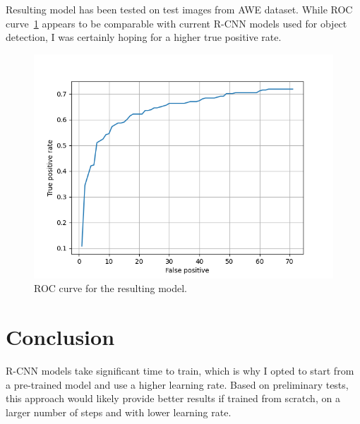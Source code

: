 \documentclass[9pt]{IEEEtran}
\begin{document}
Resulting model has been tested on test images from AWE dataset. While ROC curve~\ref{fig:plot1} appears to be comparable with current R-CNN models used for object detection, I was certainly hoping for a higher true positive rate.

\begin{figure}[h]
    \centering
    \includegraphics[width=1\columnwidth]{plot.png}
    \caption{ROC curve for the resulting model.}
    \label{fig:plot1}
\end{figure}

\section{Conclusion}

R-CNN models take significant time to train, which is why I opted to start from a pre-trained model and use a higher learning rate. Based on preliminary tests, this approach would likely provide better results if trained from scratch, on a larger number of steps and with lower learning rate.



\end{document}
